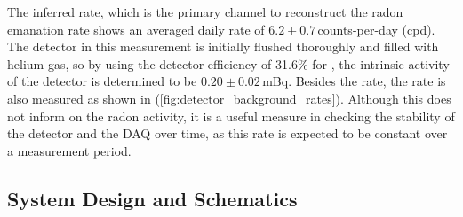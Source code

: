The inferred \PoTOF{} rate, which is the primary channel to reconstruct the radon emanation rate shows an averaged daily rate of $6.2\pm{}0.7$\,counts-per-day (cpd). The detector in this measurement is initially flushed thoroughly and filled with helium gas, so by using the detector efficiency of 31.6\% for \PoTOF{}, the intrinsic activity of the detector is determined to be $0.20\pm0.02$\,mBq. Besides the \PoTOF{} rate, the \PoTOZ{} rate is also measured as shown in (\ref{fig:detector_background_rates}). Although this does not inform on the radon activity, it is a useful measure in checking the stability of the detector and the DAQ over time, as this rate is expected to be constant over a measurement period. 

\subsection{System Design and Schematics}
\label{secsec:system_design_schematics}

